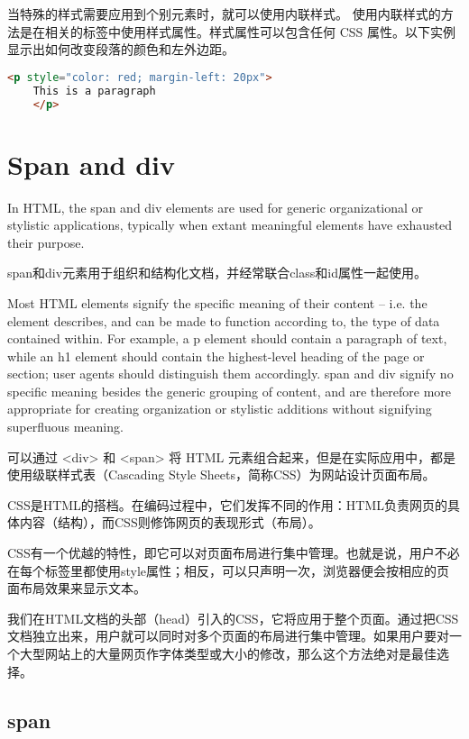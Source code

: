 当特殊的样式需要应用到个别元素时，就可以使用内联样式。 使用内联样式的方法是在相关的标签中使用样式属性。样式属性可以包含任何 CSS 属性。以下实例显示出如何改变段落的颜色和左外边距。

\begin{lstlisting}[language=HTML]
	<p style="color: red; margin-left: 20px">
	This is a paragraph
	</p>
\end{lstlisting}




\chapter{Span and div}


In HTML, the span and div elements are used for generic organizational or stylistic applications, typically when extant meaningful elements have exhausted their purpose.


span和div元素用于组织和结构化文档，并经常联合class和id属性一起使用。


Most HTML elements signify the specific meaning of their content – i.e. the element describes, and can be made to function according to, the type of data contained within. For example, a p element should contain a paragraph of text, while an h1 element should contain the highest-level heading of the page or section; user agents should distinguish them accordingly. span and div signify no specific meaning besides the generic grouping of content, and are therefore more appropriate for creating organization or stylistic additions without signifying superfluous meaning.

可以通过 <div> 和 <span> 将 HTML 元素组合起来，但是在实际应用中，都是使用级联样式表（Cascading Style Sheets，简称CSS）为网站设计页面布局。

CSS是HTML的搭档。在编码过程中，它们发挥不同的作用：HTML负责网页的具体内容（结构），而CSS则修饰网页的表现形式（布局）。

CSS有一个优越的特性，即它可以对页面布局进行集中管理。也就是说，用户不必在每个标签里都使用style属性；相反，可以只声明一次，浏览器便会按相应的页面布局效果来显示文本。

我们在HTML文档的头部（head）引入的CSS，它将应用于整个页面。通过把CSS文档独立出来，用户就可以同时对多个页面的布局进行集中管理。如果用户要对一个大型网站上的大量网页作字体类型或大小的修改，那么这个方法绝对是最佳选择。

\section{span}

